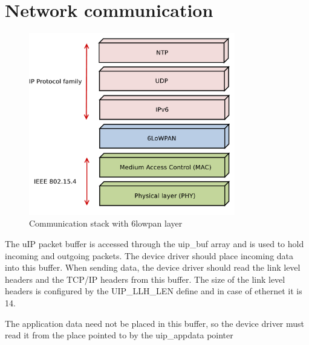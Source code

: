 \section{Network communication}
\begin{figure}
  \centering
  \includegraphics[width=9cm,keepaspectratio]{fig/6lowpan.pdf}
  \caption{Communication stack with 6lowpan layer}
  \label{fig:implementation-6lowpan}
  \bigskip
\end{figure}


The uIP packet buffer is accessed through
the uip\_buf array and is used to hold incoming and outgoing packets.
The device driver should place incoming data into this buffer.
When sending data, the device driver should read the link
level headers and the TCP/IP headers from this buffer.
The size of the link level headers is configured by the UIP\_LLH\_LEN
define and in case of ethernet it is 14.

The application data need not be placed in this buffer, so
the device driver must read it from the place pointed to by the
uip\_appdata pointer %
